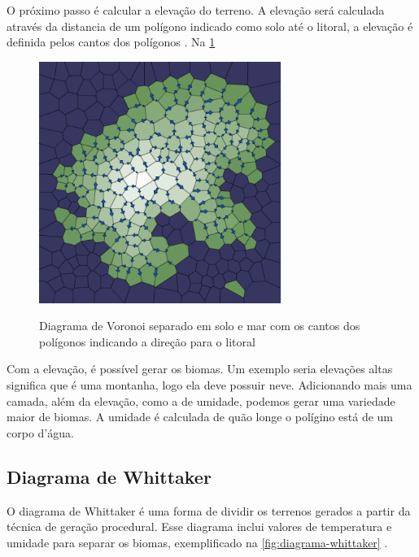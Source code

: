 O próximo passo é calcular a elevação do terreno. A elevação será calculada através da distancia de um polígono indicado como solo até o litoral, a elevação é definida pelos cantos dos polígonos \space\cite{amitp2010}. Na \cref{fig:downslopes}

\begin{figure}[ht]
	\caption{Diagrama de Voronoi separado em solo e mar com os cantos dos polígonos indicando a direção para o litoral}
	\centering
	\includegraphics[width=0.7\textwidth]{figures/downslopes.png}
	\label{fig:downslopes}
\end{figure}

Com a elevação, é possível gerar os biomas. Um exemplo seria elevações altas significa que é uma montanha, logo ela deve possuir neve. Adicionando mais uma camada, além da elevação, como a de umidade, podemos gerar uma variedade maior de biomas. A umidade é calculada de quão longe o polígino está de um corpo d'água.

\subsection*{Diagrama de Whittaker}

O diagrama de Whittaker é uma forma de dividir os terrenos gerados a partir da técnica de geração procedural. Esse diagrama inclui valores de temperatura e umidade para separar os biomas, exemplificado na \cref{fig:diagrama-whittaker} \space\cite{wikidotwhittakerdiagram}.

